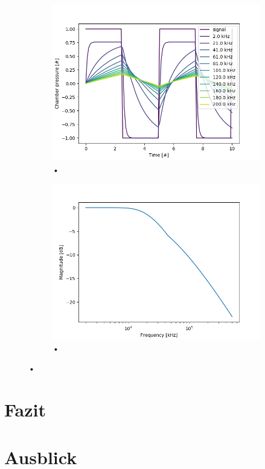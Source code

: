 \documentclass[fontsize=12pt, a4paper]{scrartcl}
\let\stdsection\section 	%
\renewcommand\section{\newpage\stdsection}
\begin{document}
\begin{figure}[H]
    \centering
    \begin{subfigure}[H]{0.48\textwidth}
        \includegraphics[width=\textwidth, valign=t]{bilder/frequency/frequency_sweep.png}
        \caption{•}
    \end{subfigure}
    \begin{subfigure}[H]{0.48\textwidth}
        \includegraphics[width=\textwidth, valign=t]{bilder/frequency/bode_diagram.png}
        \caption{•}
    \end{subfigure}
    \caption{•}
\end{figure}

\section{Fazit}

\section{Ausblick}

\printbibliography
\end{document}
